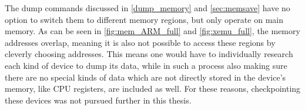 The dump commands discussed in \autoref{dump_memory} and \autoref{sec:memsave}
have no option to switch them to different memory regions, but only operate on main memory.
As can be seen in \autoref{fig:mem_ARM_full} and \autoref{fig:xemu_full},
the memory addresses overlap, meaning it is also not possible to access these regions
by cleverly choosing addresses.
This means one would have to individually research each kind of device to dump its data,
while in such a process also making sure there are no special kinds of data which are not directly stored in the device's memory,
like CPU registers, are included as well.
For these reasons, checkpointing these devices was not pursued further in this thesis.